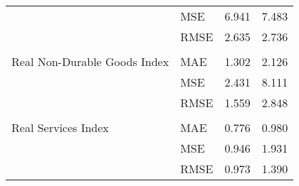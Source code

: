 \documentclass[a4paper,12pt]{article}
\begin{document}
\begin{table}
\begin{tabular}{llcc}
 & MSE & 6.941 & 7.483 \\
 & RMSE & 2.635 & 2.736 \\
\arrayrulecolor{black!30}\midrule &  &  &  \\
Real Non-Durable Goods Index & MAE & 1.302 & 2.126 \\
 & MSE & 2.431 & 8.111 \\
 & RMSE & 1.559 & 2.848 \\
\arrayrulecolor{black!30}\midrule &  &  &  \\
Real Services Index & MAE & 0.776 & 0.980 \\
 & MSE & 0.946 & 1.931 \\
 & RMSE & 0.973 & 1.390 \\
\bottomrule
\end{tabular}
\end{table}
\end{document}
